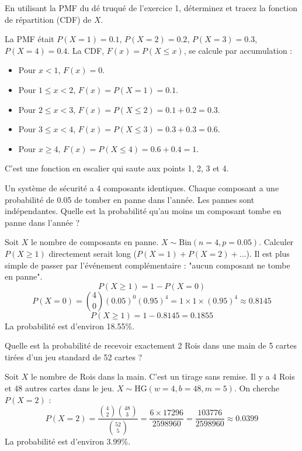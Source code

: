 \begin{exercicebox}[CDF]
En utilisant la PMF du dé truqué de l'exercice 1, déterminez et tracez la fonction de répartition (CDF) de $X$.
\end{exercicebox}

\begin{correctionbox}
La PMF était $P(X=1)=0.1$, $P(X=2)=0.2$, $P(X=3)=0.3$, $P(X=4)=0.4$.
La CDF, $F(x)=P(X \le x)$, se calcule par accumulation :
\begin{itemize}
    \item Pour $x < 1$, $F(x) = 0$.
    \item Pour $1 \le x < 2$, $F(x) = P(X=1) = 0.1$.
    \item Pour $2 \le x < 3$, $F(x) = P(X \le 2) = 0.1 + 0.2 = 0.3$.
    \item Pour $3 \le x < 4$, $F(x) = P(X \le 3) = 0.3 + 0.3 = 0.6$.
    \item Pour $x \ge 4$, $F(x) = P(X \le 4) = 0.6 + 0.4 = 1$.
\end{itemize}
C'est une fonction en escalier qui saute aux points 1, 2, 3 et 4.
\end{correctionbox}

\begin{exercicebox}
Un système de sécurité a 4 composants identiques. Chaque composant a une probabilité de 0.05 de tomber en panne dans l'année. Les pannes sont indépendantes. Quelle est la probabilité qu'au moins un composant tombe en panne dans l'année ?
\end{exercicebox}

\begin{correctionbox}
Soit $X$ le nombre de composants en panne. $X \sim \text{Bin}(n=4, p=0.05)$.
Calculer $P(X \ge 1)$ directement serait long ($P(X=1)+P(X=2)+...$). Il est plus simple de passer par l'événement complémentaire : "aucun composant ne tombe en panne".
$$ P(X \ge 1) = 1 - P(X=0) $$
$$ P(X=0) = \binom{4}{0} (0.05)^0 (0.95)^4 = 1 \times 1 \times (0.95)^4 \approx 0.8145 $$
$$ P(X \ge 1) = 1 - 0.8145 = 0.1855 $$
La probabilité est d'environ 18.55\%.
\end{correctionbox}

\begin{exercicebox}
Quelle est la probabilité de recevoir exactement 2 Rois dans une main de 5 cartes tirées d'un jeu standard de 52 cartes ?
\end{exercicebox}

\begin{correctionbox}
Soit $X$ le nombre de Rois dans la main. C'est un tirage sans remise. Il y a 4 Rois et 48 autres cartes dans le jeu. $X \sim \text{HG}(w=4, b=48, m=5)$.
On cherche $P(X=2)$ :
$$ P(X=2) = \frac{\binom{4}{2} \binom{48}{3}}{\binom{52}{5}} = \frac{6 \times 17296}{2598960} = \frac{103776}{2598960} \approx 0.0399 $$
La probabilité est d'environ 3.99\%.
\end{correctionbox}

